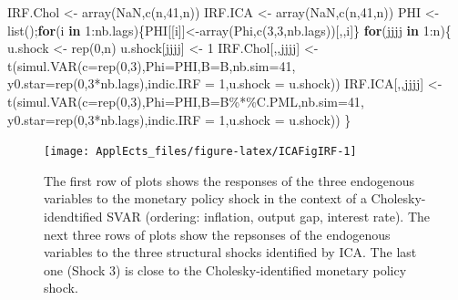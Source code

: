 \documentclass[
  12pt,
]{book}
\newenvironment{Shaded}{\begin{snugshade}}{\end{snugshade}}
\newcommand{\AttributeTok}[1]{\textcolor[rgb]{0.77,0.63,0.00}{#1}}
\newcommand{\ConstantTok}[1]{\textcolor[rgb]{0.00,0.00,0.00}{#1}}
\newcommand{\ControlFlowTok}[1]{\textcolor[rgb]{0.13,0.29,0.53}{\textbf{#1}}}
\newcommand{\DecValTok}[1]{\textcolor[rgb]{0.00,0.00,0.81}{#1}}
\newcommand{\FunctionTok}[1]{\textcolor[rgb]{0.00,0.00,0.00}{#1}}
\newcommand{\NormalTok}[1]{#1}
\newcommand{\OtherTok}[1]{\textcolor[rgb]{0.56,0.35,0.01}{#1}}
\newcommand{\SpecialCharTok}[1]{\textcolor[rgb]{0.00,0.00,0.00}{#1}}
\theoremstyle{definition}
\theoremstyle{definition}
\theoremstyle{definition}
\theoremstyle{definition}
\theoremstyle{remark}
\begin{document}
\begin{Shaded}
\begin{Highlighting}[]
\NormalTok{IRF.Chol }\OtherTok{\textless{}{-}} \FunctionTok{array}\NormalTok{(}\ConstantTok{NaN}\NormalTok{,}\FunctionTok{c}\NormalTok{(n,}\DecValTok{41}\NormalTok{,n))}
\NormalTok{IRF.ICA  }\OtherTok{\textless{}{-}} \FunctionTok{array}\NormalTok{(}\ConstantTok{NaN}\NormalTok{,}\FunctionTok{c}\NormalTok{(n,}\DecValTok{41}\NormalTok{,n))}
\NormalTok{PHI }\OtherTok{\textless{}{-}} \FunctionTok{list}\NormalTok{();}\ControlFlowTok{for}\NormalTok{(i }\ControlFlowTok{in} \DecValTok{1}\SpecialCharTok{:}\NormalTok{nb.lags)\{PHI[[i]]}\OtherTok{\textless{}{-}}\FunctionTok{array}\NormalTok{(Phi,}\FunctionTok{c}\NormalTok{(}\DecValTok{3}\NormalTok{,}\DecValTok{3}\NormalTok{,nb.lags))[,,i]\}}
\ControlFlowTok{for}\NormalTok{(jjjj }\ControlFlowTok{in} \DecValTok{1}\SpecialCharTok{:}\NormalTok{n)\{}
\NormalTok{  u.shock }\OtherTok{\textless{}{-}} \FunctionTok{rep}\NormalTok{(}\DecValTok{0}\NormalTok{,n)}
\NormalTok{  u.shock[jjjj] }\OtherTok{\textless{}{-}} \DecValTok{1}
\NormalTok{  IRF.Chol[,,jjjj] }\OtherTok{\textless{}{-}} \FunctionTok{t}\NormalTok{(}\FunctionTok{simul.VAR}\NormalTok{(}\AttributeTok{c=}\FunctionTok{rep}\NormalTok{(}\DecValTok{0}\NormalTok{,}\DecValTok{3}\NormalTok{),}\AttributeTok{Phi=}\NormalTok{PHI,}\AttributeTok{B=}\NormalTok{B,}\AttributeTok{nb.sim=}\DecValTok{41}\NormalTok{,}
                                  \AttributeTok{y0.star=}\FunctionTok{rep}\NormalTok{(}\DecValTok{0}\NormalTok{,}\DecValTok{3}\SpecialCharTok{*}\NormalTok{nb.lags),}\AttributeTok{indic.IRF =} \DecValTok{1}\NormalTok{,}\AttributeTok{u.shock =}\NormalTok{ u.shock))}
\NormalTok{  IRF.ICA[,,jjjj]  }\OtherTok{\textless{}{-}} \FunctionTok{t}\NormalTok{(}\FunctionTok{simul.VAR}\NormalTok{(}\AttributeTok{c=}\FunctionTok{rep}\NormalTok{(}\DecValTok{0}\NormalTok{,}\DecValTok{3}\NormalTok{),}\AttributeTok{Phi=}\NormalTok{PHI,}\AttributeTok{B=}\NormalTok{B}\SpecialCharTok{\%*\%}\NormalTok{C.PML,}\AttributeTok{nb.sim=}\DecValTok{41}\NormalTok{,}
                                  \AttributeTok{y0.star=}\FunctionTok{rep}\NormalTok{(}\DecValTok{0}\NormalTok{,}\DecValTok{3}\SpecialCharTok{*}\NormalTok{nb.lags),}\AttributeTok{indic.IRF =} \DecValTok{1}\NormalTok{,}\AttributeTok{u.shock =}\NormalTok{ u.shock))}
\NormalTok{\}}
\end{Highlighting}
\end{Shaded}

\begin{figure}
\texttt{[image: ApplEcts\_files/figure-latex/ICAFigIRF-1]} \caption{The first row of plots shows the responses of the three endogenous variables to the monetary policy shock in the context of a Cholesky-idendtified SVAR (ordering: inflation, output gap, interest rate). The next three rows of plots show the repsonses of the endogenous variables to the three structural shocks identified by ICA. The last one (Shock 3) is close to the Cholesky-identified monetary policy shock.}\label{fig:ICAFigIRF}
\end{figure}
\end{document}
